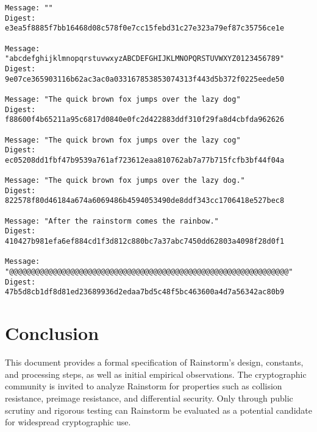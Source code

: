\documentclass[11pt,a4paper]{article}
\begin{document}
\begin{verbatim}
Message: ""
Digest: e3ea5f8885f7bb16468d08c578f0e7cc15febd31c27e323a79ef87c35756ce1e

Message: "abcdefghijklmnopqrstuvwxyzABCDEFGHIJKLMNOPQRSTUVWXYZ0123456789"
Digest: 9e07ce365903116b62ac3ac0a033167853853074313f443d5b372f0225eede50

Message: "The quick brown fox jumps over the lazy dog"
Digest: f88600f4b65211a95c6817d0840e0fc2d422883ddf310f29fa8d4cbfda962626

Message: "The quick brown fox jumps over the lazy cog"
Digest: ec05208dd1fbf47b9539a761af723612eaa810762ab7a77b715fcfb3bf44f04a

Message: "The quick brown fox jumps over the lazy dog."
Digest: 822578f80d46184a674a6069486b4594053490de8ddf343cc1706418e527bec8

Message: "After the rainstorm comes the rainbow."
Digest: 410427b981efa6ef884cd1f3d812c880bc7a37abc7450dd62803a4098f28d0f1

Message: "@@@@@@@@@@@@@@@@@@@@@@@@@@@@@@@@@@@@@@@@@@@@@@@@@@@@@@@@@@@@@@@@"
Digest: 47b5d8cb1df8d81ed23689936d2edaa7bd5c48f5bc463600a4d7a56342ac80b9
\end{verbatim}

\section*{Conclusion}
This document provides a formal specification of Rainstorm’s design, constants, and processing steps, as well as initial empirical observations. The cryptographic community is invited to analyze Rainstorm for properties such as collision resistance, preimage resistance, and differential security. Only through public scrutiny and rigorous testing can Rainstorm be evaluated as a potential candidate for widespread cryptographic use.
\end{document}
